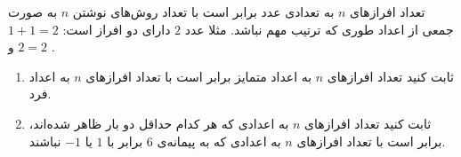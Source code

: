 \EXERCISE
تعداد افرازهای
$n$
به تعدادی عدد برابر است با تعداد روش‌های نوشتن
$n$
به صورت جمعی از اعداد طوری که ترتیب مهم نباشد. مثلا عدد
$2$
دارای دو افراز است:
$1 + 1 = 2$
و
$2 = 2$
.
\begin{enumerate}
\item
ثابت کنید تعداد افرازهای
$n$
به اعداد متمایز برابر است با تعداد افرازهای
$n$
به اعداد فرد.
\item
ثابت کنید تعداد افرازهای
$n$
به اعدادی که هر کدام حداقل دو بار ظاهر شده‌اند، برابر است با تعداد افرازهای
$n$
به اعدادی که به پیمانه‌ی
$6$
برابر با
$1$
یا
$-1$
نباشند.
\end{enumerate}